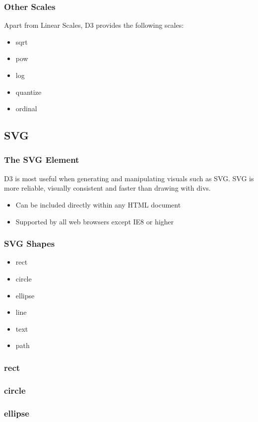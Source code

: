 \documentclass[red]{beamer}
\begin{document}
\begin{frame}
  \frametitle{Other Scales}
  Apart from Linear Scales, D3 provides the following scales:
  \begin{itemize}
  \item<1->sqrt
  \item<2->pow
  \item<3->log
  \item<4->quantize
  \item<5->ordinal
  \end{itemize}
\end{frame}

\subsection{SVG}

\begin{frame}
    \frametitle{The SVG Element}
    D3 is most useful when generating and manipulating visuals such as SVG. SVG is more reliable, visually consistent and faster than drawing with divs. 
    \newline
    \begin{itemize}
    \item<1-> Can be included directly within any HTML document
    \item<2-> Supported by all web browsers except IE8 or higher
    \end{itemize}
\end{frame}

\begin{frame}
  \frametitle{SVG Shapes}
  \begin{itemize}
    \item<1 -> rect
    \item<2 -> circle
    \item<3 -> ellipse
    \item<4 -> line
    \item<5 -> text
    \item<6 -> path
  \end{itemize}
\end{frame}

\begin{frame}
  \frametitle{rect}
  \lstrect
\end{frame}

\begin{frame}
  \frametitle{circle}
  \lstcircle
\end{frame}

\begin{frame}
  \frametitle{ellipse}
  \lstellipse
\end{frame}
\end{document}
